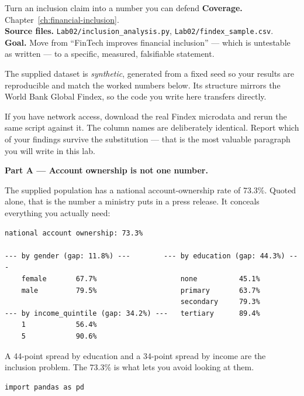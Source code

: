 
\begin{labproject}{Turn an inclusion claim into a number you can defend}
\textbf{Coverage.} Chapter~\ref{ch:financial-inclusion}.\\
\textbf{Source files.} \texttt{Lab02/inclusion\_analysis.py}, \texttt{Lab02/findex\_sample.csv}.\\
\textbf{Goal.} Move from ``FinTech improves financial inclusion'' --- which is untestable as written --- to a specific, measured, falsifiable statement.

\begin{labmode}
The supplied dataset is \emph{synthetic}, generated from a fixed seed so your results are reproducible and match the worked numbers below. Its structure mirrors the World Bank Global Findex, so the code you write here transfers directly.

If you have network access, download the real Findex microdata and rerun the same script against it. The column names are deliberately identical. Report which of your findings survive the substitution --- that is the most valuable paragraph you will write in this lab.
\end{labmode}

\medskip\noindent\textbf{Part A --- Account ownership is not one number.}\par
The supplied population has a national account-ownership rate of 73.3\%. Quoted alone, that is the number a ministry puts in a press release. It conceals everything you actually need:

\begin{lstlisting}[style=mlterminal]
national account ownership: 73.3%

--- by gender (gap: 11.8%) ---        --- by education (gap: 44.3%) ---
    female       67.7%                    none          45.1%
    male         79.5%                    primary       63.7%
                                          secondary     79.3%
--- by income_quintile (gap: 34.2%) ---   tertiary      89.4%
    1            56.4%
    5            90.6%
\end{lstlisting}

A 44-point spread by education and a 34-point spread by income are the inclusion problem. The 73.3\% is what lets you avoid looking at them.

\begin{lstlisting}[style=mlpython]
import pandas as pd


\end{lstlisting}
\end{labproject}
